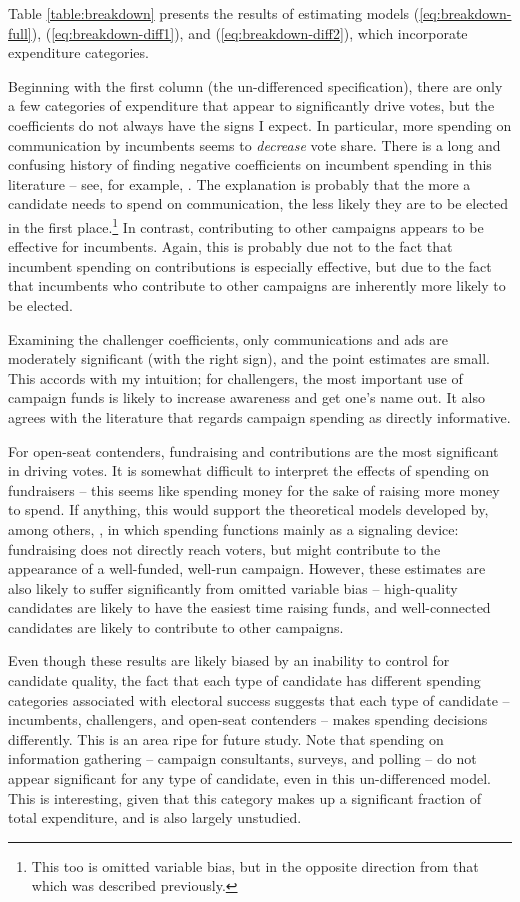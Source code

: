 \documentclass{article}
\begin{document}
Table \ref{table:breakdown} presents the results of estimating models (\ref{eq:breakdown-full}), (\ref{eq:breakdown-diff1}), and (\ref{eq:breakdown-diff2}), which incorporate expenditure categories.

Beginning with the first column (the un-differenced specification), there are only a few categories of expenditure that appear to significantly drive votes, but the coefficients do not always have the signs I expect. In particular, more spending on communication by incumbents seems to \textit{decrease} vote share. There is a long and confusing history of finding negative coefficients on incumbent spending in this literature -- see, for example, \cite{ansolabehere1994mismeasure}. The explanation is probably that the more a candidate needs to spend on communication, the less likely they are to be elected in the first place.\footnote{This too is omitted variable bias, but in the opposite direction from that which was described previously.} In contrast, contributing to other campaigns appears to be effective for incumbents. Again, this is probably due not to the fact that incumbent spending on contributions is especially effective, but due to the fact that incumbents who contribute to other campaigns are inherently more likely to be elected.

Examining the challenger coefficients, only communications and ads are moderately significant (with the right sign), and the point estimates are small. This accords with my intuition; for challengers, the most important use of campaign funds is likely to increase awareness and get one's name out. It also agrees with the literature that regards campaign spending as directly informative.

For open-seat contenders, fundraising and contributions are the most significant in driving votes. It is somewhat difficult to interpret the effects of spending on fundraisers -- this seems like spending money for the sake of raising more money to spend. If anything, this would support the theoretical models developed by, among others, \cite{prat2002campaign}, in which spending functions mainly as a signaling device: fundraising does not directly reach voters, but might contribute to the appearance of a well-funded, well-run campaign. However, these estimates are also likely to suffer significantly from omitted variable bias -- high-quality candidates are likely to have the easiest time raising funds, and well-connected candidates are likely to contribute to other campaigns. 

Even though these results are likely biased by an inability to control for candidate quality, the fact that each type of candidate has different spending categories associated with electoral success suggests that each type of candidate -- incumbents, challengers, and open-seat contenders -- makes spending decisions differently. This is an area ripe for future study. Note that spending on information gathering -- campaign consultants, surveys, and polling -- do not appear significant for any type of candidate, even in this un-differenced model. This is interesting, given that this category makes up a significant fraction of total expenditure, and is also largely unstudied.
\end{document}
